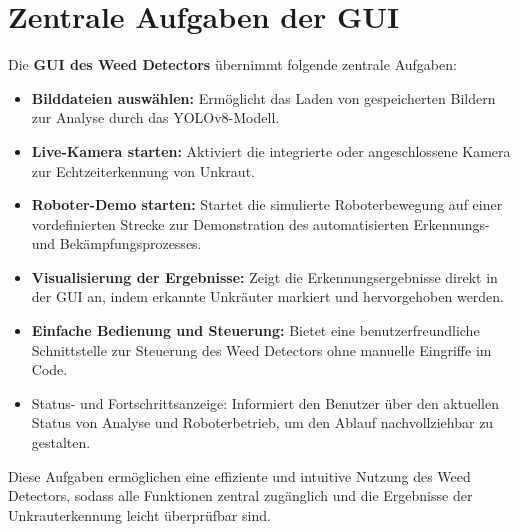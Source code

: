 \documentclass[12pt, a4paper]{scrreprt}
\begin{document}
\section{Zentrale Aufgaben der GUI}
Die \textbf{GUI des Weed Detectors} übernimmt folgende zentrale Aufgaben:
\begin{itemize}
    \item \textbf{Bilddateien auswählen:} Ermöglicht das Laden von gespeicherten Bildern zur Analyse durch das YOLOv8-Modell.
    \item \textbf{Live-Kamera starten:} Aktiviert die integrierte oder angeschlossene Kamera zur Echtzeiterkennung von Unkraut.
    \item \textbf{Roboter-Demo starten:} Startet die simulierte Roboterbewegung auf einer vordefinierten Strecke zur Demonstration des automatisierten Erkennungs- und Bekämpfungsprozesses.
    \item \textbf{Visualisierung der Ergebnisse:} Zeigt die Erkennungsergebnisse direkt in der GUI an, indem erkannte Unkräuter markiert und hervorgehoben werden.
    \item \textbf{Einfache Bedienung und Steuerung:} Bietet eine benutzerfreundliche Schnittstelle zur Steuerung des Weed Detectors ohne manuelle Eingriffe im Code.
    \item {Status- und Fortschrittsanzeige:} Informiert den Benutzer über den aktuellen Status von Analyse und Roboterbetrieb, um den Ablauf nachvollziehbar zu gestalten.
\end{itemize}
Diese Aufgaben ermöglichen eine effiziente und intuitive Nutzung des Weed Detectors, sodass alle Funktionen zentral zugänglich und die Ergebnisse der Unkrauterkennung leicht überprüfbar sind.

\newpage
\end{document}
